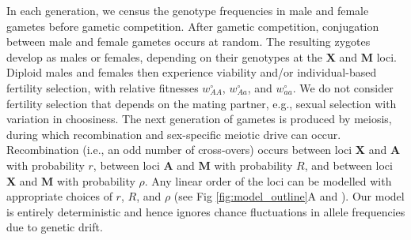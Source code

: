 \documentclass[10pt,letterpaper]{article}
\begin{document}
In each generation, we census the genotype frequencies in male and female gametes before gametic competition. 
After gametic competition, conjugation between male and female gametes occurs at random.
The resulting zygotes develop as males or females, depending on their genotypes at the $\mathbf{X}$ and $\mathbf{M}$ loci. 
Diploid males and females then experience viability and/or individual-based fertility selection, with relative fitnesses $w_{AA}^{\circ}$, $w_{Aa}^{\circ}$, and $w_{aa}^{\circ}$. 
We do not consider fertility selection that depends on the mating partner, e.g., sexual selection with variation in choosiness. 
The next generation of gametes is produced by meiosis, during which recombination and sex-specific meiotic drive can occur. 
Recombination (i.e., an odd number of cross-overs) occurs between loci $\mathbf{X}$ and $\mathbf{A}$ with probability $r$, between loci $\mathbf{A}$ and $\mathbf{M}$ with probability $R$, and between loci $\mathbf{X}$ and $\mathbf{M}$ with probability $\rho$.
Any linear order of the loci can be modelled with appropriate choices of $r$, $R$, and $\rho$ (see Fig \ref{fig:model_outline}A and ). 
Our model is entirely deterministic and hence ignores chance fluctuations in allele frequencies due to genetic drift.
\end{document}
